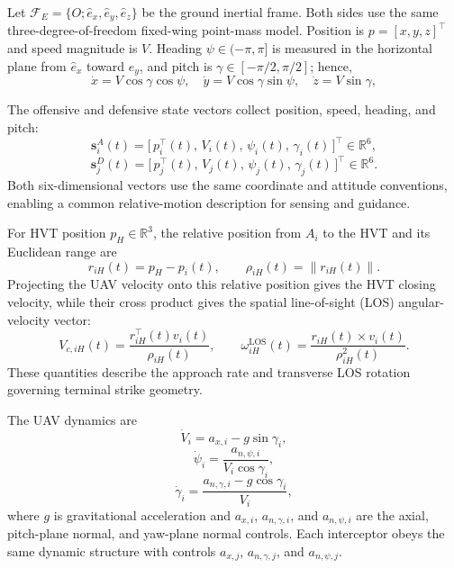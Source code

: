 \documentclass{cja}
\begin{document}
Let $\mathcal{F}_E=\{O;\hat{e}_x,\hat{e}_y,\hat{e}_z\}$ be the ground inertial frame. Both sides use the same three-degree-of-freedom fixed-wing point-mass model. Position is $p=[x,y,z]^\top$ and speed magnitude is $V$. Heading $\psi\in(-\pi,\pi]$ is measured in the horizontal plane from $\hat e_x$ toward $\hat e_y$, and pitch is $\gamma\in[-\pi/2,\pi/2]$; hence,
\begin{equation}
\dot x = V\cos\gamma\cos\psi,\quad
\dot y = V\cos\gamma\sin\psi,\quad
\dot z = V\sin\gamma,
\label{eq:vel-decomp}
\end{equation}

The offensive and defensive state vectors collect position, speed, heading, and pitch:
\begin{equation}
\mathbf s_i^{A}(t)=\bigl[\,p_i^\top(t),\,V_i(t),\,\psi_i(t),\,\gamma_i(t)\,\bigr]^\top\in\mathbb{R}^{6},
\label{eq:att-state}
\end{equation}
\begin{equation}
\mathbf s_j^{D}(t)=\bigl[\,p_j^\top(t),\,V_j(t),\,\psi_j(t),\,\gamma_j(t)\,\bigr]^\top\in\mathbb{R}^{6}.
\label{eq:def-state}
\end{equation}
Both six-dimensional vectors use the same coordinate and attitude conventions, enabling a common relative-motion description for sensing and guidance.

For HVT position $p_H\in\mathbb{R}^3$, the relative position from $A_i$ to the HVT and its Euclidean range are
\begin{equation}
r_{iH}(t)=p_H-p_i(t),\qquad
\rho_{iH}(t)=\|r_{iH}(t)\|.
\label{eq:riH-def}
\end{equation}
Projecting the UAV velocity onto this relative position gives the HVT closing velocity, while their cross product gives the spatial line-of-sight (LOS) angular-velocity vector:
\begin{equation}
V_{c,iH}(t)=\frac{r_{iH}^{\top}(t)v_i(t)}{\rho_{iH}(t)},\qquad
\omega_{iH}^{\mathrm{LOS}}(t)=\frac{r_{iH}(t)\times v_i(t)}{\rho_{iH}^2(t)}.
\label{eq:hvt_kinematics_def}
\end{equation}
These quantities describe the approach rate and transverse LOS rotation governing terminal strike geometry.

The UAV dynamics are
\begin{equation}
\dot V_i=a_{x,i}-g\sin\gamma_i,
\label{eq:dyn-V}
\end{equation}
\begin{equation}
\dot\psi_i=\frac{a_{n,\psi,i}}{V_i\cos\gamma_i},
\label{eq:dyn-psi}
\end{equation}
\begin{equation}
\dot\gamma_i=\frac{a_{n,\gamma,i}-g\cos\gamma_i}{V_i},
\label{eq:dyn-gamma}
\end{equation}
where $g$ is gravitational acceleration and $a_{x,i}$, $a_{n,\gamma,i}$, and $a_{n,\psi,i}$ are the axial, pitch-plane normal, and yaw-plane normal controls. Each interceptor obeys the same dynamic structure with controls $a_{x,j}$, $a_{n,\gamma,j}$, and $a_{n,\psi,j}$.
\end{document}
